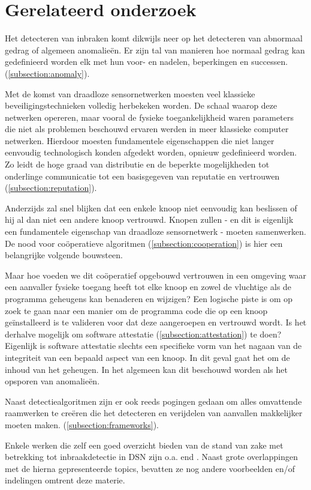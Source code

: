 \section{Gerelateerd onderzoek}
\label{section:related}

Het detecteren van inbraken komt dikwijls neer op het detecteren van abnormaal
gedrag of algemeen anomalie\"en. Er zijn tal van manieren hoe normaal gedrag
kan gedefinieerd worden elk met hun voor- en nadelen, beperkingen en successen.
(\ref{subsection:anomaly}).

Met de komst van draadloze sensornetwerken moesten veel klassieke
beveiligingstechnieken volledig herbekeken worden. De schaal waarop deze
netwerken opereren, maar vooral de fysieke toegankelijkheid waren parameters
die niet als problemen beschouwd ervaren werden in meer klassieke computer
netwerken. Hierdoor moesten fundamentele eigenschappen die niet langer
eenvoudig technologisch konden afgedekt worden, opnieuw gedefinieerd worden. Zo
leidt de hoge graad van distributie en de beperkte mogelijkheden tot onderlinge
communicatie tot een basisgegeven van reputatie en vertrouwen
(\ref{subsection:reputation}).

Anderzijds zal snel blijken dat een enkele knoop niet eenvoudig kan beslissen
of hij al dan niet een andere knoop vertrouwd. Knopen zullen - en dit is
eigenlijk een fundamentele eigenschap van draadloze sensornetwerk - moeten
samenwerken. De nood voor co\"operatieve algoritmen
(\ref{subsection:cooperation}) is hier een belangrijke volgende bouwsteen.

Maar hoe voeden we dit co\"operatief opgebouwd vertrouwen in een omgeving waar
een aanvaller fysieke toegang heeft tot elke knoop en zowel de vluchtige als de
programma geheugens kan benaderen en wijzigen? Een logische piste is om op zoek
te gaan naar een manier om de programma code die op een knoop ge\"installeerd
is te valideren voor dat deze aangeroepen en vertrouwd wordt. Is het derhalve
mogelijk om software attestatie (\ref{subsection:attestation}) te doen?
Eigenlijk is software attestatie slechts een specifieke vorm van het nagaan van
de integriteit van een bepaald aspect van een knoop. In dit geval gaat het om
de inhoud van het geheugen. In het algemeen kan dit beschouwd worden als het
opsporen van anomalie\"en.

Naast detectiealgoritmen zijn er ook reeds pogingen gedaan om alles omvattende
raamwerken te cre\"eren die het detecteren en verijdelen van aanvallen
makkelijker moeten maken. (\ref{subsection:frameworks}).

Enkele werken die zelf een goed overzicht bieden van de stand van zake met
betrekking tot inbraakdetectie in DSN zijn o.a. \citep{mishra2004intrusion} end
\citep{alrajeh2013intrusion}. Naast grote overlappingen met de hierna
gepresenteerde topics, bevatten ze nog andere voorbeelden en/of indelingen
omtrent deze materie.







